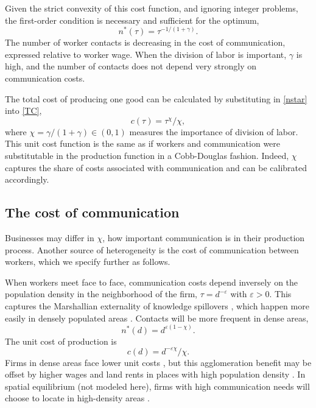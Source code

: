 Given the strict convexity of this cost function, and ignoring integer problems, the first-order condition is necessary and sufficient for the optimum,
\begin{equation}\label{nstar}
	n^*(\tau) = \tau^{-1/(1+\gamma)}.
\end{equation}
The number of worker contacts is decreasing in the cost of communication, expressed relative to worker wage. When the division of labor is important, $\gamma$ is high, and the number of contacts does not depend very strongly on communication costs.

The total cost of producing one good can be calculated by substituting in \eqref{nstar} into \eqref{TC},
\begin{equation}\label{cost}
	c(\tau) = \tau^{\chi}/\chi,
\end{equation}
where $\chi=\gamma/(1+\gamma)\in(0,1)$ measures the importance of division of labor. This unit cost function is the same as if workers and communication were substitutable in the production function in a Cobb-Douglas fashion. Indeed, $\chi$ captures the share of costs associated with communication and can be calibrated accordingly.

\subsection*{The cost of communication}
Businesses may differ in $\chi$, how important communication is in their production process. Another source of heterogeneity is the cost of communication between workers, which we specify further as follows.

When workers meet face to face, communication costs depend inversely on the population density in the neighborhood of the firm, $\tau=d^{-\varepsilon}$ with $\varepsilon>0$. This captures the Marshallian externality of knowledge spillovers \cite{Marshall1920-ps}, which happen more easily in densely populated areas \cite{Charlot2004-zr,Rossi-Hansberg2007-tm,Ioannides2008-bs,Tian2019-wq}. Contacts will be more frequent in dense areas,
\begin{equation}\label{communication}
	n^*(d) = d^{\varepsilon(1-\chi)}.
\end{equation}
The unit cost of production is
\begin{equation}\label{cost2}
c(d) = d^{-\varepsilon\chi}/\chi.
\end{equation}
Firms in dense areas face lower unit costs \cite{Ciccone1996-gu}, but this agglomeration benefit may be offset by higher wages and land rents in places with high population density \cite{Eberts1982-zf,Madden1985-pq,Combes2019-ud}. In spatial equilibrium (not modeled here), firms with high communication needs will choose to locate in high-density areas \cite{Tian2019-wq}.

